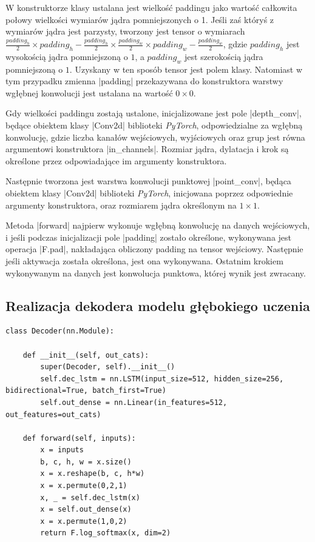 W konstruktorze klasy ustalana jest wielkość paddingu jako wartość całkowita połowy wielkości wymiarów jądra pomniejszonych o 1. Jeśli zaś któryś z wymiarów jądra jest parzysty, tworzony jest tensor o wymiarach $\frac{padding_h}{2} \times padding_h - \frac{padding_h}{2} \times \frac{padding_w}{2} \times padding_w - \frac{padding_w}{2}$, gdzie $padding_h$ jest wysokością jądra pomniejszoną o $1$, a $padding_w$ jest szerokością jądra pomniejszoną o $1$. Uzyskany w ten sposób tensor jest polem klasy. Natomiast w tym przypadku zmienna \pyth|padding| przekazywana do konstruktora warstwy wgłębnej konwolucji jest ustalana na wartość $0 \times 0$.

Gdy wielkości paddingu zostają ustalone, inicjalizowane jest pole \pyth|depth_conv|, będące obiektem klasy \pyth|Conv2d| biblioteki \textit{PyTorch}, odpowiedzialne za wgłębną konwolucję, gdzie liczba kanałów wejściowych, wyjściowych oraz grup jest równa argumentowi konstruktora \pyth|in_channels|. Rozmiar jądra, dylatacja i krok są określone przez odpowiadające im argumenty konstruktora.

Następnie tworzona jest warstwa konwolucji punktowej \pyth|point_conv|, będąca obiektem klasy \pyth|Conv2d| biblioteki \textit{PyTorch}, inicjowana poprzez odpowiednie argumenty konstruktora, oraz rozmiarem jądra określonym na $1 \times 1$.

Metoda \pyth|forward| najpierw wykonuje wgłębną konwolucję na danych wejściowych, i jeśli podczas inicjalizacji pole \pyth|padding| zostało określone, wykonywana jest operacja \pyth|F.pad|, nakładająca obliczony padding na tensor wejściowy. Następnie jeśli aktywacja została określona, jest ona wykonywana. Ostatnim krokiem wykonywanym na danych jest konwolucja punktowa, której wynik jest zwracany.

\subsection{Realizacja dekodera modelu głębokiego uczenia} \label{Decoder}
\begin{lstlisting}[caption={\pyth|Decoder| - klasa dekodera modelu głębokiego uczenia}, label={decoder}]
class Decoder(nn.Module):

	def __init__(self, out_cats):
		super(Decoder, self).__init__()
		self.dec_lstm = nn.LSTM(input_size=512, hidden_size=256, bidirectional=True, batch_first=True)
		self.out_dense = nn.Linear(in_features=512, out_features=out_cats)
	
	def forward(self, inputs):
		x = inputs
		b, c, h, w = x.size()
		x = x.reshape(b, c, h*w)
		x = x.permute(0,2,1)
		x, _ = self.dec_lstm(x)
		x = self.out_dense(x)
		x = x.permute(1,0,2)
		return F.log_softmax(x, dim=2)
\end{lstlisting}

